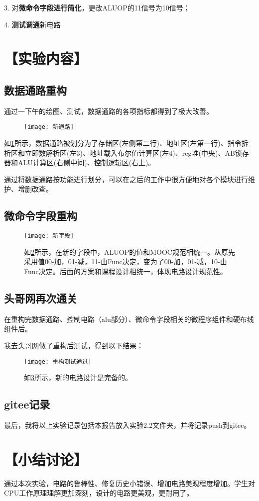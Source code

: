 \documentclass[withoutpreface]{cumcmthesis}
\begin{document}
3. 对\textbf{微命令字段进行简化}，更改ALUOP的11信号为10信号；

4. \textbf{测试调通}新电路

\section{【实验内容】}
\subsection{数据通路重构}
	通过一下午的绘图、测试，数据通路的各项指标都得到了极大改善。
\begin{figure}[!h]
	\centering
	\texttt{[image: 新通路]}
	\caption[数据通路重构]{}
	\label{fig:datar_re}
\end{figure}
	如\cref{fig:datar_re}所示，数据通路被划分为了存储区(左侧第二行)、地址区(左第一行)、指令拆析区和立即数解析区(左3)、地址载入布尔值计算区(左4)、reg堆(中央)、AB锁存器和ALU计算区(右侧中间)、控制逻辑区(右上)。
	
	通过将数据通路按功能进行划分，可以在之后的工作中很方便地对各个模块进行维护、增删改查。
\subsection{微命令字段重构}
	\begin{figure}[!h]
		\centering
		\texttt{[image: 新字段]}
		\caption[微命令字段重构]{}
		\label{fig:microIseg_re}
		如\cref{fig:microIseg_re}所示，在新的字段中，ALUOP的值和MOOC规范相统一。从原先采用值00-加，01-减，11-由Func决定，变为了00-加，01-减，10-由Func决定。后面的方案和课程设计相统一，体现电路设计规范性。
	\end{figure}
\subsection{头哥网再次通关}
	在重构完数据通路、控制电路（alu部分）、微命令字段相关的微程序组件和硬布线组件后。
	
	我去头哥网做了重构后测试，得到以下结果：
	\begin{figure}[!h]
		\centering
		\texttt{[image: 重构测试通过]}
		\caption[重构测试通过]{}
		\label{fig:pass}
		如\cref{fig:pass}所示，新的电路设计是完备的。
	\end{figure}
\subsection{gitee记录}
	最后，我将以上实验记录包括本报告放入实验2.2文件夹，并将记录push到gitee。
	
\section{【小结讨论】}
	通过本次实验，电路的鲁棒性、修复历史小错误、增加电路美观程度增加。学生对CPU工作原理理解更加深刻，设计的电路更美观，更耐用了。
\end{document}
